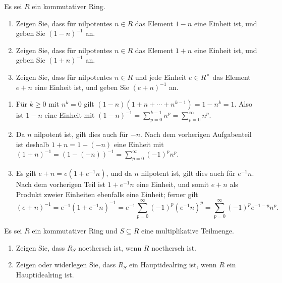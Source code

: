\begin{question}
  Es sei $R$ ein kommutativer Ring.
  \begin{enumerate}
    \item
      Zeigen Sie, dass für nilpotentes $n \in R$ das Element $1 - n$ eine Einheit ist, und geben Sie $(1 - n)^{-1}$ an.
    \item
      Zeigen Sie, dass für nilpotentes $n \in R$ das Element $1 + n$ eine Einheit ist, und geben Sie $(1 + n)^{-1}$ an.
    \item
      Zeigen Sie, dass für nilpotentes $n \in R$ und jede Einheit $e \in R^\times$ das Element $e + n$ eine Einheit ist, und geben Sie $(e + n)^{-1}$ an.
  \end{enumerate}
\end{question}


\begin{solution}
  \begin{enumerate}
    \item
      Für $k \geq 0$ mit $n^k = 0$ gilt $(1 - n)(1 + n + \dotsb + n^{k-1}) = 1 - n^k = 1$.
      Also ist $1 - n$ eine Einheit mit $(1-n)^{-1} = \sum_{p=0}^{k-1} n^p = \sum_{p=0}^\infty n^p$.
    \item
      Da $n$ nilpotent ist, gilt dies auch für $-n$.
      Nach dem vorherigen Aufgabenteil ist deshalb $1 + n = 1 - (-n)$ eine Einheit mit $(1 + n)^{-1} = (1 - (-n))^{-1} = \sum_{p=0}^\infty (-1)^p n^p$.
    \item
      Es gilt $e + n = e(1 + e^{-1} n)$, und da $n$ nilpotent ist, gilt dies auch für $e^{-1} n$.
      Nach dem vorherigen Teil ist $1 + e^{-1} n$ eine Einheit, und somit $e + n$ als Produkt zweier Einheiten ebenfalls eine Einheit; ferner gilt
      \[
          (e + n)^{-1}
        = e^{-1} (1 + e^{-1} n)^{-1}
        = e^{-1} \sum_{p=0}^\infty (-1)^p (e^{-1} n)^p
        = \sum_{p=0}^\infty (-1)^p e^{-1-p} n^p.
      \]
  \end{enumerate}
\end{solution}


\begin{question}
  Es sei $R$ ein kommutativer Ring und $S \subseteq R$ eine multiplikative Teilmenge.
  \begin{enumerate}
    \item
      Zeigen Sie, dass $R_S$ noethersch ist, wenn $R$ noethersch ist.
    \item
      Zeigen oder widerlegen Sie, dass $R_S$ ein Hauptidealring ist, wenn $R$ ein Hauptidealring ist.
  \end{enumerate}
\end{question}


